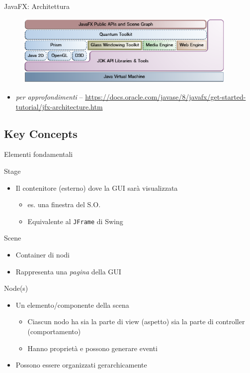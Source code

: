 \documentclass[presentation]{beamer}
\begin{document}
\begin{frame}{JavaFX: Architettura}
\begin{figure}
\includegraphics[width=0.95\textwidth]{img/javafx-architecture.png}
\end{figure}
\begin{itemize}
\item \emph{per approfondimenti} -- \url{https://docs.oracle.com/javase/8/javafx/get-started-tutorial/jfx-architecture.htm}
\end{itemize}
\end{frame}

\subsection{Key Concepts}

\begin{frame}{Elementi fondamentali}
\begin{block}{Stage}
\begin{itemize}
\item Il contenitore (esterno) dove la GUI sarà visualizzata
\begin{itemize}
\item es. una finestra del S.O.
\item Equivalente al \texttt{JFrame} di Swing
\end{itemize}
\end{itemize}

\end{block}

\begin{block}{Scene}
\begin{itemize}
\item Container di nodi
\item Rappresenta una \emph{pagina} della GUI
\end{itemize}
\end{block}

\begin{block}{Node(s)}
\begin{itemize}
\item Un elemento/componente della scena
\begin{itemize}
\item Ciascun nodo ha sia la parte di view (aspetto) sia la parte di controller (comportamento)
\item Hanno proprietà e possono generare eventi
\end{itemize}
\item Possono essere organizzati gerarchicamente
\end{itemize}
\end{block}
\end{frame}
\end{document}

